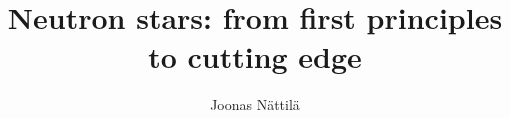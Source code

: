 \begin{titlepage} 

    \title{\titlefont Neutron stars: from first principles to cutting edge}
    
    \author{Joonas Nättilä}
    \date{}
    \maketitle


\end{titlepage}
